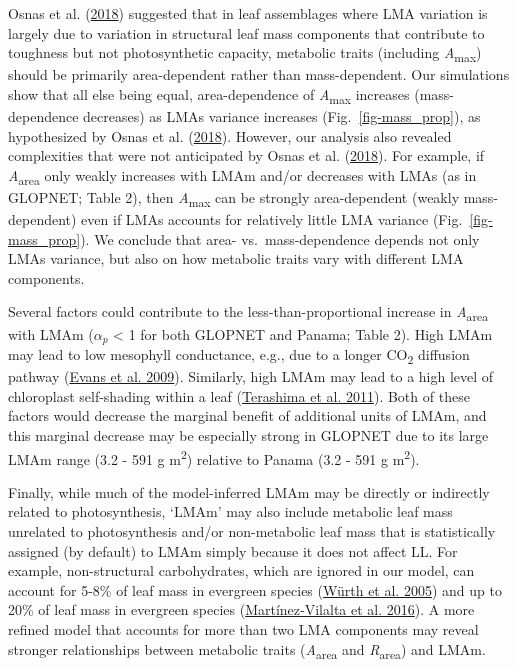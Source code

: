 \documentclass[
  12pt,
  letterpaper,
  DIV=11,
  numbers=noendperiod]{scrartcl}
\begin{document}
Osnas et al. (\protect\hyperlink{ref-Osnas2018}{2018}) suggested that in
leaf assemblages where LMA variation is largely due to variation in
structural leaf mass components that contribute to toughness but not
photosynthetic capacity, metabolic traits (including
\emph{A}\textsubscript{max}) should be primarily area-dependent rather
than mass-dependent. Our simulations show that all else being equal,
area-dependence of \emph{A}\textsubscript{max} increases
(mass-dependence decreases) as LMAs variance increases
(Fig.~\ref{fig-mass_prop}), as hypothesized by Osnas et al.
(\protect\hyperlink{ref-Osnas2018}{2018}). However, our analysis also
revealed complexities that were not anticipated by Osnas et al.
(\protect\hyperlink{ref-Osnas2018}{2018}). For example, if
\emph{A}\textsubscript{area} only weakly increases with LMAm and/or
decreases with LMAs (as in GLOPNET; Table 2), then
\emph{A}\textsubscript{max} can be strongly area-dependent (weakly
mass-dependent) even if LMAs accounts for relatively little LMA variance
(Fig.~\ref{fig-mass_prop}). We conclude that area- vs.~mass-dependence
depends not only LMAs variance, but also on how metabolic traits vary
with different LMA components.

Several factors could contribute to the less-than-proportional increase
in \emph{A}\textsubscript{area} with LMAm (\(\alpha_p\) \textless{} 1
for both GLOPNET and Panama; Table 2). High LMAm may lead to low
mesophyll conductance, e.g., due to a longer CO\textsubscript{2}
diffusion pathway (\protect\hyperlink{ref-Evans2009}{Evans et al.
2009}). Similarly, high LMAm may lead to a high level of chloroplast
self-shading within a leaf
(\protect\hyperlink{ref-Terashima2011}{Terashima et al. 2011}). Both of
these factors would decrease the marginal benefit of additional units of
LMAm, and this marginal decrease may be especially strong in GLOPNET due
to its large LMAm range (3.2 - 591 g m\textsuperscript{2}) relative to
Panama (3.2 - 591 g m\textsuperscript{2}).

Finally, while much of the model-inferred LMAm may be directly or
indirectly related to photosynthesis, `LMAm' may also include metabolic
leaf mass unrelated to photosynthesis and/or non-metabolic leaf mass
that is statistically assigned (by default) to LMAm simply because it
does not affect LL. For example, non-structural carbohydrates, which are
ignored in our model, can account for 5-8\% of leaf mass in evergreen
species (\protect\hyperlink{ref-Wurth2005}{Würth et al. 2005}) and up to
20\% of leaf mass in evergreen species
(\protect\hyperlink{ref-Martinez-Vilalta2016}{Martínez‐Vilalta et al.
2016}). A more refined model that accounts for more than two LMA
components may reveal stronger relationships between metabolic traits
(\emph{A}\textsubscript{area} and \emph{R}\textsubscript{area}) and
LMAm.
\end{document}
